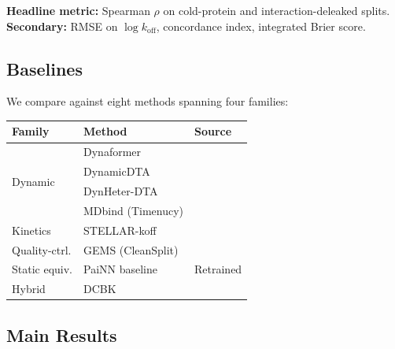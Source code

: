 \documentclass{article}
\begin{document}
\textbf{Headline metric:} Spearman $\rho$ on cold-protein and
interaction-deleaked splits.
\textbf{Secondary:} RMSE on $\log k_\text{off}$, concordance index,
integrated Brier score.

\subsection{Baselines}

We compare against eight methods spanning four families:

\begin{center}
\footnotesize
\begin{tabular}{@{}lll@{}}
\toprule
\textbf{Family} & \textbf{Method} & \textbf{Source} \\
\midrule
\multirow{4}{*}{Dynamic} & Dynaformer & \citet{lu2024dynaformer} \\
 & DynamicDTA & \citet{yang2025dynamicdta} \\
 & DynHeter-DTA & \citet{chen2025dynheterdta} \\
 & MDbind (Timenucy) & \citet{zheng2025mdbind} \\
\midrule
Kinetics & STELLAR-koff & \citet{liu2025stellar} \\
\midrule
Quality-ctrl. & GEMS (CleanSplit) & \citet{li2025cleansplit} \\
\midrule
Static equiv. & PaiNN baseline & Retrained \\
\midrule
Hybrid & DCBK & \citet{kokh2025dcbk} \\
\bottomrule
\end{tabular}
\end{center}

\subsection{Main Results}
\end{document}
